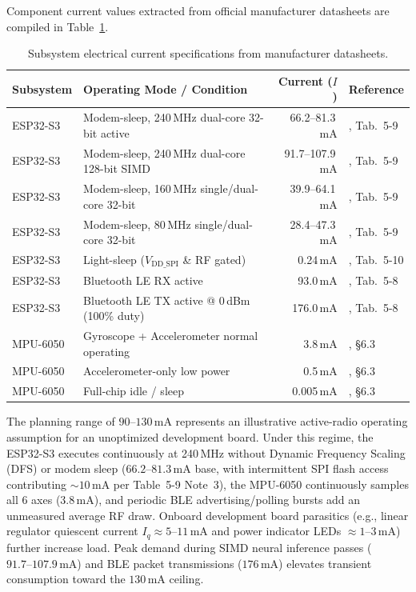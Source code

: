 Component current values extracted from official manufacturer datasheets are compiled in Table~\ref{tab:power_budget}.

\begin{table}[htbp]
\centering
\caption{Subsystem electrical current specifications from manufacturer datasheets.}
\label{tab:power_budget}
\small
\begin{tabular}{@{}llrl@{}}
\toprule
\textbf{Subsystem} & \textbf{Operating Mode / Condition} & \textbf{Current ($I$)} & \textbf{Reference} \\
\midrule
ESP32-S3 & Modem-sleep, 240\,MHz dual-core 32-bit active & 66.2--81.3\,mA & \cite{espressif2024esp32s3}, Tab.~5-9 \\
ESP32-S3 & Modem-sleep, 240\,MHz dual-core 128-bit SIMD & 91.7--107.9\,mA & \cite{espressif2024esp32s3}, Tab.~5-9 \\
ESP32-S3 & Modem-sleep, 160\,MHz single/dual-core 32-bit & 39.9--64.1\,mA & \cite{espressif2024esp32s3}, Tab.~5-9 \\
ESP32-S3 & Modem-sleep, 80\,MHz single/dual-core 32-bit & 28.4--47.3\,mA & \cite{espressif2024esp32s3}, Tab.~5-9 \\
ESP32-S3 & Light-sleep ($V_{\mathrm{DD\_SPI}}$ \& RF gated) & 0.24\,mA & \cite{espressif2024esp32s3}, Tab.~5-10 \\
ESP32-S3 & Bluetooth LE RX active & 93.0\,mA & \cite{espressif2024esp32s3}, Tab.~5-8 \\
ESP32-S3 & Bluetooth LE TX active @ 0\,dBm (100\% duty) & 176.0\,mA & \cite{espressif2024esp32s3}, Tab.~5-8 \\
MPU-6050 & Gyroscope + Accelerometer normal operating & 3.8\,mA & \cite{invensense2013mpu6050}, \S6.3 \\
MPU-6050 & Accelerometer-only low power & 0.5\,mA & \cite{invensense2013mpu6050}, \S6.3 \\
MPU-6050 & Full-chip idle / sleep & 0.005\,mA & \cite{invensense2013mpu6050}, \S6.3 \\
\bottomrule
\end{tabular}
\end{table}

The planning range of $90\text{--}130\,\mathrm{mA}$ represents an illustrative active-radio operating assumption for an unoptimized development board. Under this regime, the ESP32-S3 executes continuously at 240\,MHz without Dynamic Frequency Scaling (DFS) or modem sleep ($66.2\text{--}81.3\,\mathrm{mA}$ base, with intermittent SPI flash access contributing $\sim 10\,\mathrm{mA}$ per Table~5-9 Note~3), the MPU-6050 continuously samples all 6 axes ($3.8\,\mathrm{mA}$), and periodic BLE advertising/polling bursts add an unmeasured average RF draw. Onboard development board parasitics (e.g., linear regulator quiescent current $I_q \approx 5\text{--}11\,\mathrm{mA}$ and power indicator LEDs $\approx 1\text{--}3\,\mathrm{mA}$) further increase load. Peak demand during SIMD neural inference passes ($91.7\text{--}107.9\,\mathrm{mA}$) and BLE packet transmissions ($176\,\mathrm{mA}$) elevates transient consumption toward the $130\,\mathrm{mA}$ ceiling.

